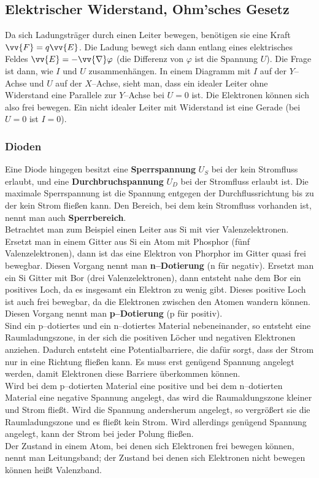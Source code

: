 \documentclass[a4paper,12pt]{article}
\begin{document}
\subsection{Elektrischer Widerstand, Ohm'sches Gesetz}
Da sich Ladungsträger durch einen Leiter bewegen, benötigen sie eine Kraft $\vv{F}=q\vv{E}$. Die Ladung bewegt sich dann entlang eines elektrisches Feldes $\vv{E}=-\vv{\nabla }\varphi $ (die Differenz von $\varphi $ ist die Spannung $U$). Die Frage ist dann, wie $I$ und $U$ zusammenhängen. In einem Diagramm mit $I$ auf der $Y$--Achse und $U$ auf der $X$--Achse, sieht man, dass ein idealer Leiter ohne Widerstand eine Parallele zur $Y$--Achse bei $U=0$ ist. Die Elektronen können sich also frei bewegen. Ein nicht idealer Leiter mit Widerstand ist eine Gerade (bei $U=0$ ist $I=0$).

\subsubsection{Dioden}
Eine Diode hingegen besitzt eine \textbf{Sperrspannung} $U_S$ bei der kein Stromfluss erlaubt, und eine \textbf{Durchbruchspannung} $U_D$ bei der Stromfluss erlaubt ist. Die maximale Sperrspannung ist die Spannung entgegen der Durchflussrichtung bis zu der kein Strom fließen kann. Den Bereich, bei dem kein Stromfluss vorhanden ist, nennt man auch \textbf{Sperrbereich}. \\\indent
Betrachtet man zum Beispiel einen Leiter aus Si mit vier Valenzelektronen. Ersetzt man in einem Gitter aus Si ein Atom mit Phosphor (fünf Valenzelektronen), dann ist das eine Elektron von Phorphor im Gitter quasi frei bewegbar. Diesen Vorgang nennt man \textbf{n--Dotierung} (n für negativ). Ersetzt man ein Si Gitter mit Bor (drei Valenzelektronen), dann entsteht nahe dem Bor ein positives Loch, da es insgesamt ein Elektron zu wenig gibt. Dieses positive Loch ist auch frei bewegbar, da die Elektronen zwischen den Atomen wandern können. Diesen Vorgang nennt man \textbf{p--Dotierung} (p für positiv).\\\indent
Sind ein p--dotiertes und ein n--dotiertes Material nebeneinander, so entsteht eine Raumladungszone, in der sich die positiven Löcher und negativen Elektronen anziehen. Dadurch entsteht eine Potentialbarriere, die dafür sorgt, dass der Strom nur in eine Richtung fließen kann. Es muss erst genügend Spannung angelegt werden, damit Elektronen diese Barriere überkommen können.\\\indent
Wird bei dem p--dotierten Material eine positive und bei dem n--dotierten Material eine negative Spannung angelegt, das wird die Raumaldungszone kleiner und Strom fließt. Wird die Spannung andersherum angelegt, so vergrößert sie die Raumladungszone und es fließt kein Strom. Wird allerdings genügend Spannung angelegt, kann der Strom bei jeder Polung fließen.\\\indent
Der Zustand in einem Atom, bei denen sich Elektronen frei bewegen können, nennt man Leitungsband; der Zustand bei denen sich Elektronen nicht bewegen können heißt Valenzband.
\end{document}
